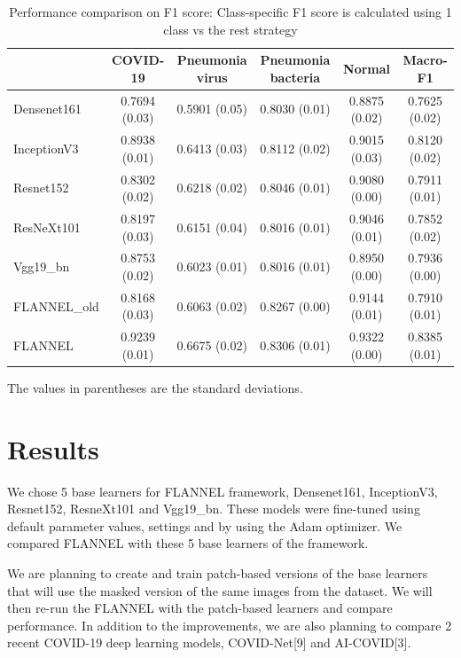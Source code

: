 \documentclass{sigkddExp}
\begin{document}
\begin{table}
    \centering
    \caption{Performance comparison on F1 score: Class-specific F1 score is calculated using 1 class vs the rest strategy}
    \label{table:resultstats}
    \begin{tabular}{ lccccc } \hline
                     & COVID-19      & Pneumonia virus & Pneumonia bacteria & Normal        & Macro-F1      \\ \hline

        Densenet161  & 0.7694 (0.03) & 0.5901 (0.05)   & 0.8030 (0.01)      & 0.8875 (0.02) & 0.7625 (0.02) \\
        InceptionV3  & 0.8938 (0.01) & 0.6413 (0.03)   & 0.8112 (0.02)      & 0.9015 (0.03) & 0.8120 (0.02) \\
        Resnet152    & 0.8302 (0.02) & 0.6218 (0.02)   & 0.8046 (0.01)      & 0.9080 (0.00) & 0.7911 (0.01) \\
        ResNeXt101   & 0.8197 (0.03) & 0.6151 (0.04)   & 0.8016 (0.01)      & 0.9046 (0.01) & 0.7852 (0.02) \\
        Vgg19\_bn    & 0.8753 (0.02) & 0.6023 (0.01)   & 0.8016 (0.01)      & 0.8950 (0.00) & 0.7936 (0.00) \\
        FLANNEL\_old & 0.8168 (0.03) & 0.6063 (0.02)   & 0.8267 (0.00)      & 0.9144 (0.01) & 0.7910 (0.01) \\
        FLANNEL      & 0.9239 (0.01) & 0.6675 (0.02)   & 0.8306 (0.01)      & 0.9322 (0.00) & 0.8385 (0.01) \\ \hline
    \end{tabular}\par
    \bigskip
    The values in parentheses are the standard deviations.
\end{table}

\section{Results}

We chose 5 base learners for FLANNEL framework, Densenet161, InceptionV3,
Resnet152, ResneXt101 and Vgg19\_bn. These models were fine-tuned using default
parameter values, settings and by using the Adam optimizer. We compared FLANNEL
with these 5 base learners of the framework.

We are planning to create and train patch-based versions of the base learners
that will use the masked version of the same images from the dataset. We will
then re-run the FLANNEL with the patch-based learners and compare performance.
In addition to the improvements, we are  also planning to compare 2 recent
COVID-19 deep learning models, COVID-Net[9] and AI-COVID[3].
\end{document}
